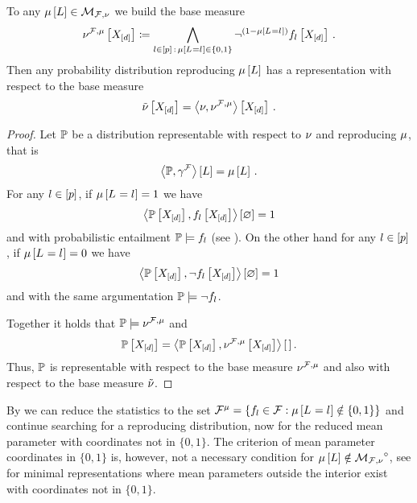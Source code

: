 \begin{theorem}\label{the:hlnMeanPolytopeReduction}
	To any $\mu\left[L\right]\in\mathcal{M}_{\mathcal{F},\nu}$ we build the base measure 
			\[ \nu^{\mathcal{F},\mu}\left[X_{[d]}\right] \coloneqq \bigwedge_{l\in[p] \, : \, \mu\left[L_{}=l_{}\right]\in\{0,1\}}
		\lnot^{(1-\mu\left[L_{}=l_{}\right])} f_{l}\left[X_{[d]}\right] \, . \]
	Then any probability distribution reproducing $\mu\left[L\right]$ has a representation with respect to the base measure
		\[ \tilde{\nu}\left[X_{[d]}\right] =  \left\langle \nu,\nu^{\mathcal{F},\mu}\right\rangle \left[ X_{[d]} \right] \, . \]
\end{theorem}
\begin{proof}
	Let $\mathbb{P}$ be a distribution representable with respect to $\nu$ and reproducing $\mu$, that is 
		\[ \left\langle \mathbb{P},\gamma^{\mathcal{F}}\right\rangle \left[ L \right] = \mu\left[L\right] \, . \]
	For any $l\in[p]$, if $\mu\left[L_{}=l_{}\right]=1$ we have 
		\[  \left\langle \mathbb{P}\left[X_{[d]}\right],f_{l}\left[X_{[d]}\right]\right\rangle \left[ \varnothing \right] =1 \]
	and with  probabilistic entailment $\mathbb{P}\models f_{l}$ (see ).
	On the other hand for any $l\in[p]$, if $\mu\left[L_{}=l_{}\right]=0$ we have 
		\[  \left\langle \mathbb{P}\left[X_{[d]}\right],\lnot f_{l}\left[X_{[d]}\right]\right\rangle \left[ \varnothing \right] =1 \]
	and with the same argumentation $\mathbb{P}\models\lnot f_{l}$.
	
	Together it holds that $\mathbb{P}\models\nu^{\mathcal{F},\mu}$ and
		\[  \mathbb{P}\left[X_{[d]}\right] = \left\langle \mathbb{P}\left[X_{[d]}\right],\nu^{\mathcal{F},\mu}\left[X_{[d]}\right]\right\rangle \left[ \, \right] . \]
	Thus, $\mathbb{P}$ is representable with respect to the base measure $\nu^{\mathcal{F},\mu}$ and also with respect to the base measure $\tilde{\nu}$.
\end{proof}

By  we can reduce the statistics to the set $\mathcal{F}^{\mu}=\{f_{l}\in\mathcal{F} : \mu\left[L_{}=l_{}\right]\notin\{0,1\}\}$ and continue searching for a reproducing distribution, now for the reduced mean parameter with coordinates not in $\{0,1\}$.
The criterion of mean parameter coordinates in $\{0,1\}$ is, however, not a necessary condition for $\mu\left[L\right]\notin{\mathcal{M}_{\mathcal{F},\nu}}^{\circ}$, see  for minimal representations where mean parameters outside the interior exist with coordinates not in $\{0,1\}$.


